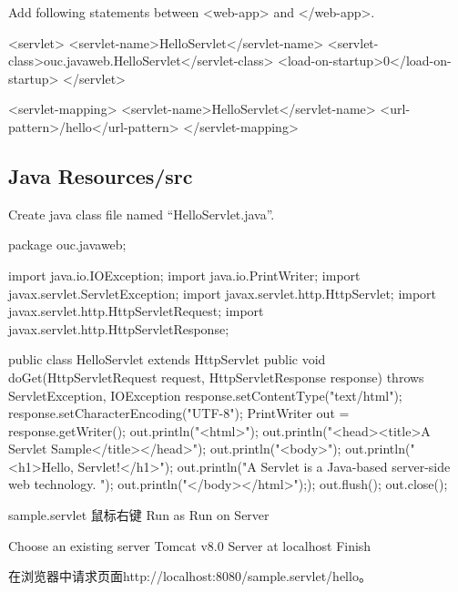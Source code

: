 Add following statements between <web-app> and </web-app>.

\begin{xmlCode}
  <servlet>
    <servlet-name>HelloServlet</servlet-name>
    <servlet-class>ouc.javaweb.HelloServlet</servlet-class>
    <load-on-startup>0</load-on-startup>
  </servlet>
    
  <servlet-mapping>
    <servlet-name>HelloServlet</servlet-name>
    <url-pattern>/hello</url-pattern>
  </servlet-mapping>  
\end{xmlCode}

\subsection{Java Resources/src}

Create java class file named ``HelloServlet.java''.

\begin{javaCode}
  package ouc.javaweb;

  import java.io.IOException;
  import java.io.PrintWriter;
  import javax.servlet.ServletException;
  import javax.servlet.http.HttpServlet;
  import javax.servlet.http.HttpServletRequest;
  import javax.servlet.http.HttpServletResponse;

  public class HelloServlet extends HttpServlet {
    public void doGet(HttpServletRequest request, HttpServletResponse response)
    throws ServletException, IOException {
      response.setContentType("text/html");
      response.setCharacterEncoding("UTF-8");
      PrintWriter out = response.getWriter();
      out.println("<html>");
      out.println("<head><title>A Servlet Sample</title></head>");
      out.println("<body>");
      out.println("<h1>Hello, Servlet!</h1>");
      out.println("A Servlet is a Java-based server-side web technology. ");
      out.println("</body></html>"););
      out.flush();
      out.close();
    }
  }
\end{javaCode}

sample.servlet  鼠标右键  Run as  Run on Server

  Choose an existing server  Tomcat v8.0 Server at localhost  Finish

在浏览器中请求页面{\Blue http://localhost:8080/sample.servlet/hello}。

